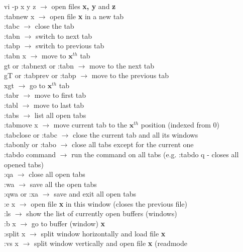 \documentclass[twoside,a4paper]{article}
\newcommand{\tcb}{\color{blue}}
\newcommand{\tcr}{\color{red}}
\newcommand{\tck}{\color{black}}
\newcommand{\ra }{$\rightarrow$ }
\begin{document}
\begin{multicols}{2}
    \tcr vi \tcb  -p x y z \tck $\rightarrow$
    open files \textbf{x, y} and \textbf{z}\\
    \tcr :tabnew \tcb  x \tck $\rightarrow$
    open file \textbf{x} in a new tab\\
    \tcr :tabc \tck \ra close the tab\\
    \tcr :tabn \tck \ra switch to next tab\\
    \tcr :tabp \tck \ra switch to previous
    tab\\
    \tcr :tabn \tcb  x \tck \ra move
    to $\textbf{x}^{th}$ tab\\
    \tcr gt or :tabnext or :tabn \tck $\rightarrow$
    move to the next tab\\
    \tcr gT or :tabprev or :tabp \tck $\rightarrow$
    move to the previous tab\\
    \tcr xgt \tck \ra go to
    $\textbf{x}^{th}$ tab\\
    \tcr :tabr \tck \ra move to first tab\\
    \tcr :tabl \tck \ra move to last tab\\
    \tcr :tabs \tck \ra list all open tabs\\
    \tcr :tabmove \tcb  x \tck $\rightarrow$
    move current tab to the $\textbf{x}^{th}$ position (indexed
    from 0)\\
    \tcr :tabclose or :tabc \tck \ra close
    the current tab and all its windows\\
    \tcr :tabonly or :tabo \tck \ra close
    all tabs except for the current one\\
    \tcr :tabdo \tcb  command \tck
    \ra run the command on all tabs (e.g. :tabdo q -
    closes all opened tabs)\\
    \tcr :qa \tck \ra close all open tabs\\
    \tcr :wa \tck \ra save all the open
    tabs\\
    \tcr :qwa or :xa \tck \ra save and exit
    all open tabs\\
    \tcr :e \tcb  x \tck \ra open
    file \textbf{x} in this window (closes the previous file)\\
    \tcr :ls \tck \ra show the list of
    currently open buffers (windows)\\
    \tcr :b \tcb  x \tck \ra go to
    buffer (window) \textbf{x}\\
    \tcr :split \tcb  x \tck \ra
    split window horizontally and load file \textbf{x}\\
    \tcr :vs \tcb  x \tck \ra
    split window vertically and open file \textbf{x} (readmode

\end{multicols}
\end{document}
